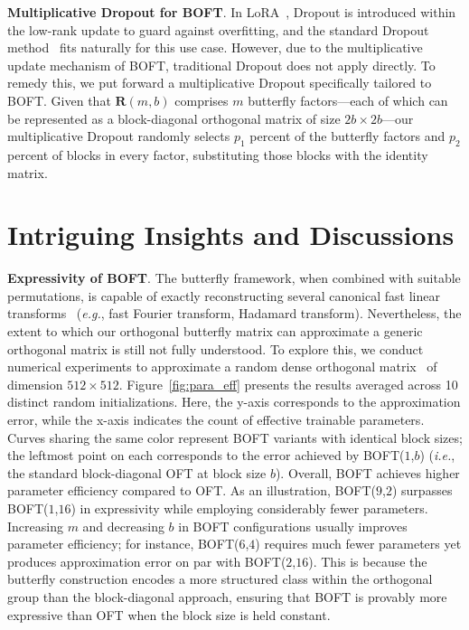 \textbf{Multiplicative Dropout for BOFT}. In LoRA~\cite{hulora2022}, Dropout is introduced within the low-rank update to guard against overfitting, and the standard Dropout method~\cite{srivastava2014dropout} fits naturally for this use case. However, due to the multiplicative update mechanism of BOFT, traditional Dropout does not apply directly. To remedy this, we put forward a multiplicative Dropout specifically tailored to BOFT. Given that $\bm{R}(m,b)$ comprises $m$ butterfly factors—each of which can be represented as a block-diagonal orthogonal matrix of size $2b\times 2b$—our multiplicative Dropout randomly selects $p_1$ percent of the butterfly factors and $p_2$ percent of blocks in every factor, substituting those blocks with the identity matrix.

\section{Intriguing Insights and Discussions}

\textbf{Expressivity of BOFT}. The butterfly framework, when combined with suitable permutations, is capable of exactly reconstructing several canonical fast linear transforms~\cite{dao2019learning,dao2019kaleidoscope} (\emph{e.g.}, fast Fourier transform, Hadamard transform). Nevertheless, the extent to which our orthogonal butterfly matrix can approximate a generic orthogonal matrix is still not fully understood. To explore this, we conduct numerical experiments to approximate a random dense orthogonal matrix~\cite{anderson1987generation} of dimension $512\times 512$. Figure~\ref{fig:para_eff} presents the results averaged across 10 distinct random initializations. Here, the y-axis corresponds to the approximation error, while the x-axis indicates the count of effective trainable parameters. Curves sharing the same color represent BOFT variants with identical block sizes; the leftmost point on each corresponds to the error achieved by BOFT($1$,$b$) (\emph{i.e.}, the standard block-diagonal OFT at block size $b$). Overall, BOFT achieves higher parameter efficiency compared to OFT. As an illustration, BOFT($9$,$2$) surpasses BOFT($1$,$16$) in expressivity while employing considerably fewer parameters. Increasing $m$ and decreasing $b$ in BOFT configurations usually improves parameter efficiency; for instance, BOFT($6$,$4$) requires much fewer parameters yet produces approximation error on par with BOFT($2$,$16$). This is because the butterfly construction encodes a more structured class within the orthogonal group than the block-diagonal approach, ensuring that BOFT is provably more expressive than OFT when the block size is held constant.

